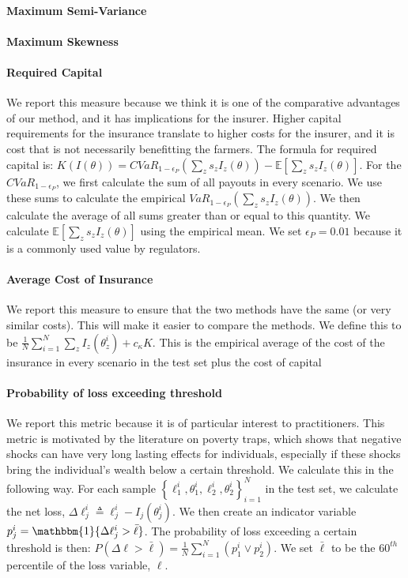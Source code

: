 \documentclass[11pt]{article}
\begin{document}
   \paragraph*{Maximum Semi-Variance}

   \paragraph*{Maximum Skewness}

   \paragraph*{Required Capital} We report this measure because we think it is one of the comparative advantages of our method, and it has implications for the insurer. Higher capital requirements for the insurance translate to higher costs for the insurer, and it is cost that is not necessarily benefitting the farmers. The formula for required capital is: $K(I(\theta)) = CVaR_{1-\epsilon_P}(\sum_z s_z I_z(\theta)) - \mathbb{E}[\sum_z s_z I_z(\theta)]$. For the $CVaR_{1-\epsilon_P}$, we first calculate the sum of all payouts in every scenario. We use these sums to calculate the empirical $VaR_{1-\epsilon_P}(\sum_z s_z I_z(\theta))$. We then calculate the average of all sums greater than or equal to this quantity. We calculate $\mathbb{E}[\sum_z s_z I_z(\theta)]$ using the empirical mean. We set $\epsilon_P = 0.01$ because it is a commonly used value by regulators. 

   \paragraph*{Average Cost of Insurance} We report this measure to ensure that the two methods have the same (or very similar costs). This will make it easier to compare the methods. We define this to be $\frac{1}{N}\sum_{i=1}^N \sum_z I_z(\theta^i_z) + c_{\kappa} K$. This is the empirical average of the cost of the insurance in every scenario in the test set plus the cost of capital

   \paragraph*{Probability of loss exceeding threshold} We report this metric because it is of particular interest to practitioners. This metric is motivated by the literature on poverty traps, which shows that negative shocks can have very long lasting effects for individuals, especially if these shocks bring the individual's wealth below a certain threshold. We calculate this in the following way. For each sample $\left \{\ell^i_1,\theta^i_1, \ell^i_2, \theta^i_2 \right \}_{i=1}^N$ in the test set, we calculate the net loss, $\Delta \ell_j^i \triangleq  \ell^i_j - I_j(\theta^i_j)$. We then create an indicator variable $p^i_j =  \mathbbm{1}\{ \Delta \ell^i_j > \bar{\ell} \}$. The probability of loss exceeding a certain threshold is then: $P(\Delta \ell > \bar{\ell}) = \frac{1}{N}\sum_{i=1}^N (p^i_1 \lor p^i_2)$. We set $\bar{\ell}$ to be the $60^{th}$ percentile of the loss variable, $\ell$.
\end{document}
